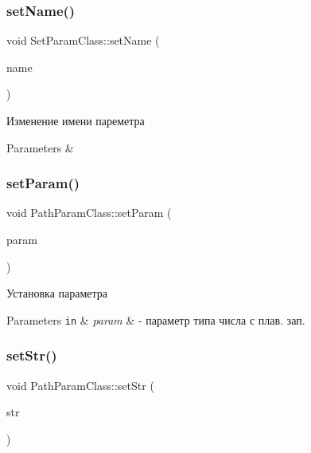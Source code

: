 \subsubsection{\texorpdfstring{set\+Name()}{setName()}}
{\footnotesize\ttfamily void Set\+Param\+Class\+::set\+Name (\begin{DoxyParamCaption}\item[{const std\+::string \&}]{name }\end{DoxyParamCaption})\hspace{0.3cm}{\ttfamily [inherited]}}



Изменение имени пареметра 


\begin{DoxyParams}{Parameters}
{\em } & \\
\hline
\end{DoxyParams}
\mbox{\label{class_path_param_class_a6990892369167db4bca6a3adb013c294}} 
\subsubsection{\texorpdfstring{set\+Param()}{setParam()}}
{\footnotesize\ttfamily void Path\+Param\+Class\+::set\+Param (\begin{DoxyParamCaption}\item[{\hyperlink{class_path_class}{Path\+Class} $\ast$}]{param }\end{DoxyParamCaption})}



Установка параметра 


\begin{DoxyParams}[1]{Parameters}
\mbox{\tt in}  & {\em param} & -\/ параметр типа числа с плав. зап. \\
\hline
\end{DoxyParams}
\mbox{\label{class_path_param_class_a714cb515a6b746c83f81606a73b3e9dc}} 
\subsubsection{\texorpdfstring{set\+Str()}{setStr()}}
{\footnotesize\ttfamily void Path\+Param\+Class\+::set\+Str (\begin{DoxyParamCaption}\item[{const std\+::string \&}]{str }\end{DoxyParamCaption})\hspace{0.3cm}{\ttfamily [virtual]}}



